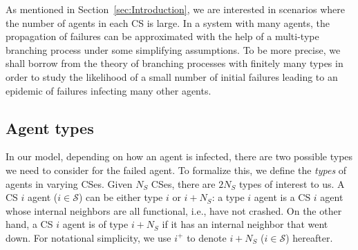 \documentclass[10pt, journal, compsoc]{IEEEtran}
\newcommand {\cS}{{\mathcal{S}}}
\newcommand{\remind}[1]{{\bf {\color{red}[\marginpar[\hbox{{\large%
$\circ$}\raisebox{0ex}{\large $\longrightarrow$}}]%
{\hbox{\raisebox{0ex}{\large $\longleftarrow$}{\large
$\circ$}}}#1]} } }
\begin{document}
As mentioned in Section~\ref{sec:Introduction}, we
are interested in scenarios where the number of 
agents in each CS
is large. In a system with many agents,  
the propagation of failures can be approximated
with the help of a multi-type branching process
under some simplifying assumptions. 
To be more precise, we shall borrow from the theory
of branching processes with finitely many types
in order to study the likelihood of a small number
of initial failures leading to an epidemic
of failures infecting many other agents. 







\subsection{Agent types}

In our model, depending on how an agent is infected, 
there are two possible types we need to consider 
for the failed agent. To formalize this, 
we define the {\em types} of agents in varying
CSes. Given $N_S$ CSes, 
there are $2 N_S$ types of interest to us. A 
CS $i$ agent ($i \in \cS$) can be either type 
$i$ or $i + N_S$: 
a type $i$ agent is a CS $i$ agent whose
internal neighbors are all 
functional, i.e., have not crashed. 
On the other hand, a CS $i$ agent is of type $i+N_S$ 
if it has an internal neighbor that 
went down. For notational simplicity, 
we use $i^+$ to denote $i + N_S$ ($i \in \cS$)
hereafter.
\end{document}
